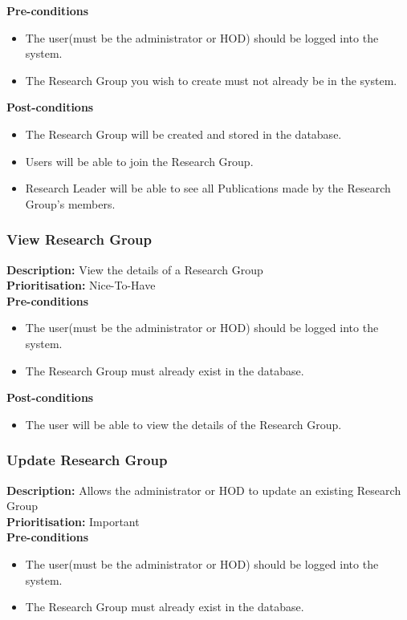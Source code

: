 \documentclass[a4paper]{article}
\begin{document}
	\textbf{Pre-conditions}
	 \begin{itemize}
		\item The user(must be the administrator or HOD) should be logged into the system.
		\item The Research Group you wish to create must not already be in the system.
	\end{itemize}
	
	\textbf{Post-conditions}
	 \begin{itemize}
		\item The Research Group will be created and stored in the database.
		\item Users will be able to join the Research Group.
		\item Research Leader will be able to see all Publications made by the Research Group's members.
	\end{itemize}
	
	\subsubsection{View Research Group}
	\textbf{Description:} View the details of a Research Group \\
	\textbf{Prioritisation:} Nice-To-Have\\
	
	\textbf{Pre-conditions}
	 \begin{itemize}
		\item The user(must be the administrator or HOD) should be logged into the system.
		\item The Research Group must already exist in the database.
    \end{itemize}
	
	\textbf{Post-conditions}
	 \begin{itemize}
		\item The user will be able to view the details of the Research Group.
	\end{itemize}
	
	\subsubsection{Update Research Group}
	\textbf{Description:} Allows the administrator or HOD to update an existing Research Group\\
	\textbf{Prioritisation:} Important\\
	
	\textbf{Pre-conditions}
	 \begin{itemize}
		\item The user(must be the administrator or HOD) should be logged into the system.
		\item The Research Group must already exist in the database.
	\end{itemize}
	
\end{document}
